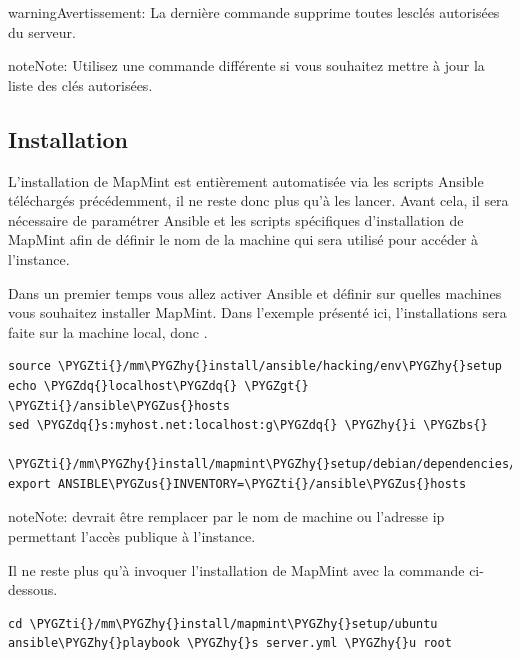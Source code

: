 \documentclass[letterpaper,10pt,french]{sphinxmanual}
\def\PYGZbs{\char`\\}
\def\PYGZus{\char`\_}
\def\PYGZgt{\char`\>}
\def\PYGZhy{\char`\-}
\def\PYGZdq{\char`\"}
\def\PYGZti{\char`\~}
\begin{document}
\begin{notice}{warning}{Avertissement:}
La dernière commande supprime toutes lesclés autorisées du
serveur.
\end{notice}

\begin{notice}{note}{Note:}
Utilisez une commande différente si vous souhaitez mettre à jour la
liste des clés autorisées.
\end{notice}


\subsection{Installation}
\label{introduction/installmapmint:installation}
L'installation de MapMint est entièrement automatisée via les scripts
Ansible téléchargés précédemment, il ne reste donc plus qu'à les
lancer. Avant cela, il sera nécessaire de paramétrer Ansible et les
scripts spécifiques d'installation de MapMint afin de définir le nom
de la machine qui sera utilisé pour accéder à l'instance.

Dans un premier temps vous allez activer Ansible et définir sur
quelles machines vous souhaitez installer MapMint. Dans l'exemple
présenté ici, l'installations sera faite sur la machine local, donc
.

\begin{Verbatim}[commandchars=\\\{\}]
source \PYGZti{}/mm\PYGZhy{}install/ansible/hacking/env\PYGZhy{}setup
echo \PYGZdq{}localhost\PYGZdq{} \PYGZgt{} \PYGZti{}/ansible\PYGZus{}hosts
sed \PYGZdq{}s:myhost.net:localhost:g\PYGZdq{} \PYGZhy{}i \PYGZbs{}
   \PYGZti{}/mm\PYGZhy{}install/mapmint\PYGZhy{}setup/debian/dependencies/vars/main.yml
export ANSIBLE\PYGZus{}INVENTORY=\PYGZti{}/ansible\PYGZus{}hosts
\end{Verbatim}

\begin{notice}{note}{Note:}
 devrait être remplacer par le nom de machine ou
l'adresse ip permettant l'accès publique à l'instance.
\end{notice}

Il ne reste plus qu'à invoquer l'installation de MapMint avec la
commande ci-dessous.

\begin{Verbatim}[commandchars=\\\{\}]
cd \PYGZti{}/mm\PYGZhy{}install/mapmint\PYGZhy{}setup/ubuntu
ansible\PYGZhy{}playbook \PYGZhy{}s server.yml \PYGZhy{}u root
\end{Verbatim}
\end{document}
